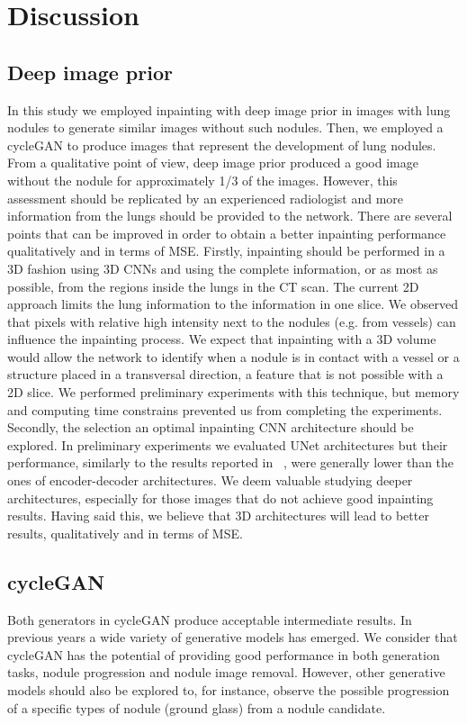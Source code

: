 \documentclass[runningheads]{llncs}
\begin{document}
\section{Discussion}
\subsection{Deep image prior}
In this study we employed inpainting with deep image prior in images with lung nodules to generate similar images without such nodules. Then, we employed a cycleGAN to produce images that represent the development of lung nodules. From a qualitative point of view, deep image prior produced a good image without the nodule for approximately 1/3 of the images. However, this assessment should be replicated by an experienced radiologist and more information from the lungs should be provided to the network. 
There are several points that can be improved in order to obtain a better inpainting performance qualitatively and in terms of MSE. Firstly, inpainting should be performed in a 3D fashion using 3D CNNs and using the complete information, or as most as possible, from the regions inside the lungs in the CT scan. The current 2D approach limits the lung information to the information in one slice. We observed that pixels with relative high intensity next to the nodules (e.g. from vessels) can influence the inpainting process. We expect that inpainting with a 3D volume would allow the network to identify when a nodule is in contact with a vessel or a structure placed in a transversal direction, a feature that is not possible with a 2D slice. We performed preliminary experiments with this technique, but memory and computing time constrains prevented us from completing the experiments. Secondly, the selection an optimal inpainting CNN architecture should be explored. In preliminary experiments we evaluated UNet architectures but their performance, similarly to the results reported in ~\cite{DBLP:journals/corr/abs-1711-10925}, were generally lower than the ones of encoder-decoder architectures. We deem valuable studying deeper architectures, especially for those images that do not achieve good inpainting results. Having said this, we believe that 3D architectures will lead to better results, qualitatively and in terms of MSE.

\subsection{cycleGAN}
Both generators in cycleGAN produce acceptable intermediate results. 
In previous years a wide variety of generative models has emerged. We consider that cycleGAN has the potential of providing good performance in both generation tasks, nodule progression and nodule image removal. However, other generative models should also be explored to, for instance, observe the possible progression of a specific types of nodule (ground glass) from a nodule candidate. 
\end{document}

